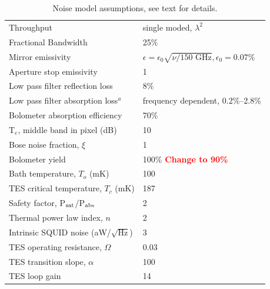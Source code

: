 \documentclass[]{spie}  %
\newcommand{\comr}[1]{\textcolor{red}{#1}}
\begin{document}
\begin{table}[ht]
\centering
\caption{Noise model assumptions, see text for details. }%
\label{tab:assume}
%
\begin{tabular}{|l|l|}
\hline
Throughput                       & single moded, $\lambda^2$          \\
Fractional Bandwidth             & 25\%                                             \\
Mirror emissivity                & $\epsilon = \epsilon_0\sqrt{\nu/\text{150~GHz}}, \epsilon_0 = 0.07\%$ \\
Aperture stop emissivity         & 1                                                \\
Low pass filter reflection loss  & 8\%                                                \\
Low pass filter absorption loss$^a$  & frequency dependent, 0.2\%--2.8\%             \\
Bolometer absorption efficiency  & 70\%                                             \\
T$_e$, middle band in pixel (dB) & 10                                               \\
Bose noise fraction, $\xi$       & 1                                                \\
Bolometer yield                 & 100\% \comr{\bf Change to 90\%}                                            \\
Bath temperature, $T_o$ (mK)    & 100                                              \\
TES critical temperature, $T_c$ (mK)   & 187                                              \\
Safety factor, P$_{\rm sat}$/P$_{\rm abs}$      & 2                                                \\
Thermal power law index, $n$    & 2                                                \\
Intrinsic SQUID noise (aW/$\sqrt{\text{Hz}}$)   & 3                        \\
TES operating resistance, $\Omega$    &  0.03                               \\
TES transition slope, $\alpha$    & 100                                         \\
TES loop gain                    & 14                                \\

\end{tabular}
\end{table}
\end{document}
